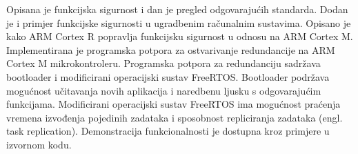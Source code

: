 \documentclass[utf8, diplomski, english, numeric]{fer}
\begin{document}
\begin{sazetak}

Opisana je funkcijska sigurnost i dan je pregled odgovarajućih standarda. Dodan je i primjer funkcijske sigurnosti u ugradbenim računalnim sustavima. Opisano je kako ARM Cortex R popravlja funkcijsku sigurnost u odnosu na ARM Cortex M.
Implementirana je programska potpora za ostvarivanje redundancije na ARM Cortex M mikrokontroleru. Programska potpora za redundanciju sadržava bootloader i modificirani operacijski sustav FreeRTOS. Bootloader podržava mogućnost učitavanja novih aplikacija i naredbenu ljusku s odgovarajućim funkcijama. Modificirani operacijski sustav FreeRTOS ima mogućnost praćenja vremena izvođenja pojedinih zadataka i sposobnost repliciranja zadataka (engl. task replication). Demonstracija funkcionalnosti je dostupna kroz primjere u izvornom kodu.

\end{sazetak}
\end{document}
